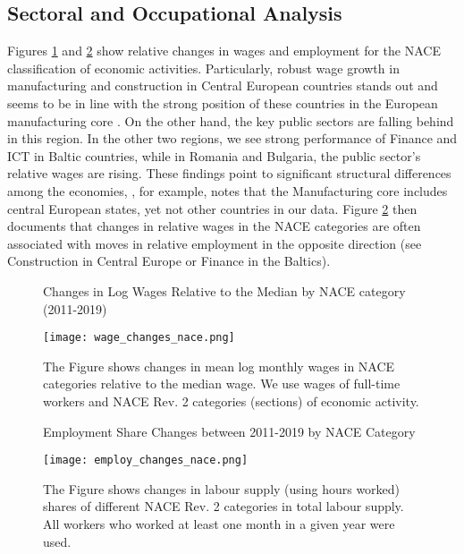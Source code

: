 \documentclass[11pt]{article}
\begin{document}
\subsection{Sectoral and Occupational Analysis}
Figures \ref{wage_changes_nace} and \ref{employ_changes_nace} show relative changes in wages and employment for the NACE classification of economic activities. Particularly, robust wage growth in manufacturing and construction in Central European countries stands out and seems to be in line with the strong position of these countries in the European manufacturing core \citep{stollinger2016structural}. On the other hand, the key public sectors are falling behind in this region. In the other two regions, we see strong performance of Finance and ICT in Baltic countries, while in Romania and Bulgaria, the public sector's relative wages are rising. These findings point to significant structural differences among the economies, \citet{stollinger2016structural}, for example, notes  that the Manufacturing core includes central European states, yet not other countries in our data.  Figure \ref{employ_changes_nace} then documents that changes in relative wages in the NACE categories are often associated with moves in relative employment in the opposite direction (see Construction in Central Europe or Finance in the Baltics).



\begin{figure}[!htbp]%
\centering
    \caption{Changes in Log Wages Relative to the Median by NACE category (2011-2019)}
    {\texttt{[image: wage\_changes\_nace.png]} }
    \caption*{\footnotesize The Figure shows changes in mean log monthly wages in NACE categories relative to the median wage. We use wages of full-time workers and NACE Rev. 2 categories (sections) of economic activity.}
\label{wage_changes_nace}
\end{figure}

\begin{figure}[!htbp]%
\centering
    \caption{Employment Share Changes between 2011-2019 by NACE Category}
    {\texttt{[image: employ\_changes\_nace.png]} }
    \caption*{\footnotesize The Figure shows changes in labour supply (using hours worked) shares of different NACE Rev. 2 categories in total labour supply. All workers who worked at least one month in a given year were used.}
\label{employ_changes_nace}
\end{figure}
\end{document}
